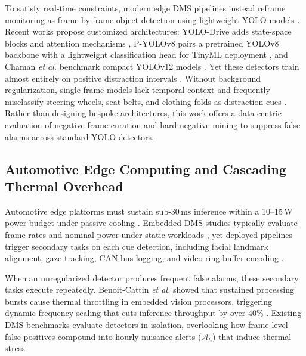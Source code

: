 \documentclass[conference]{IEEEtran}
\begin{document}
To satisfy real-time constraints, modern edge DMS pipelines instead reframe monitoring as frame-by-frame object detection using lightweight YOLO models \cite{yolodrive2025, pyolov82024}. Recent works propose customized architectures: YOLO-Drive adds state-space blocks and attention mechanisms \cite{yolodrive2025}, P-YOLOv8 pairs a pretrained YOLOv8 backbone with a lightweight classification head for TinyML deployment \cite{pyolov82024}, and Chaman \textit{et al.} benchmark compact YOLOv12 models \cite{yolov12dms2025}. Yet these detectors train almost entirely on positive distraction intervals \cite{yolodrive2025, pyolov82024}. Without background regularization, single-frame models lack temporal context and frequently misclassify steering wheels, seat belts, and clothing folds as distraction cues \cite{canas2021detection}. Rather than designing bespoke architectures, this work offers a data-centric evaluation of negative-frame curation and hard-negative mining to suppress false alarms across standard YOLO detectors.

\subsection{Automotive Edge Computing and Cascading Thermal Overhead}
Automotive edge platforms must sustain sub-30\,ms inference within a 10--15\,W power budget under passive cooling \cite{florez2024real, liu2019edge}. Embedded DMS studies typically evaluate frame rates and nominal power under static workloads \cite{florez2024real}, yet deployed pipelines trigger secondary tasks on each cue detection, including facial landmark alignment, gaze tracking, CAN bus logging, and video ring-buffer encoding \cite{florez2024real, liu2019edge}.

When an unregularized detector produces frequent false alarms, these secondary tasks execute repeatedly. Benoit-Cattin \textit{et al.} showed that sustained processing bursts cause thermal throttling in embedded vision processors, triggering dynamic frequency scaling that cuts inference throughput by over 40\% \cite{benoitcattin2020thermal}. Existing DMS benchmarks evaluate detectors in isolation, overlooking how frame-level false positives compound into hourly nuisance alerts ($\mathcal{A}_h$) that induce thermal stress.
\end{document}
